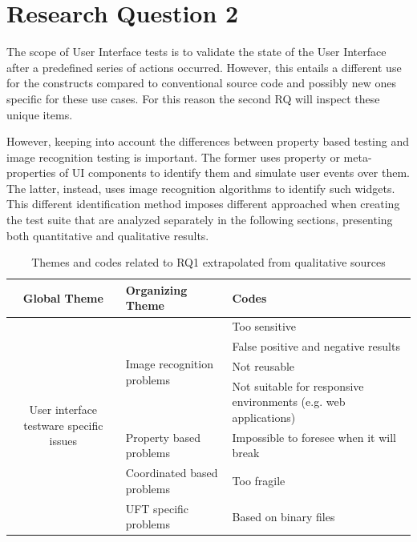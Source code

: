 \FloatBarrier

\section{Research Question 2}
%
The scope of User Interface tests is to validate the state of the User Interface after a predefined series of actions occurred. However, this entails a different use for the constructs compared to conventional source code and possibly new ones specific for these use cases. For this reason the second RQ will inspect these unique items.

However, keeping into account the differences between property based testing and image recognition testing is important. The former uses property or meta-properties of UI components to identify them and simulate user events over them. The latter, instead, uses image recognition algorithms to identify such widgets. This different identification method imposes different approached when creating the test suite that are analyzed separately in the following sections, presenting both quantitative and qualitative results.


  
\begin{table}
\renewcommand{\arraystretch}{1.5}
\centering
\begin{tabular}{ c p{4.3cm} p{4.6cm}}
    
    \hline       
    {\large Global Theme} & {\large Organizing Theme} & {\large Codes}\\
    \hline
    
    \multirow{7}{*}{\parbox[b]{4.3cm}{
        User interface testware specific issues
    }
    } & \multirow{4}{*}{\parbox[c]{4.3cm}{Image recognition problems}}
        & Too sensitive \\
        & & False positive and negative results\\
        & & Not reusable\\ 
        & & Not suitable for responsive environments (e.g. web applications)\\ \cline{2-3}
        
    & Property based problems & Impossible to foresee when it will break\\ \cline{2-3}
        
    & Coordinated based problems  & Too fragile\\ \cline{2-3}
        
    & UFT specific problems & Based on binary files\\
        
    \hline
\end{tabular}
\caption{Themes and codes related to RQ1 extrapolated from qualitative sources}
\label{tab:themes_rq2}
\end{table}

